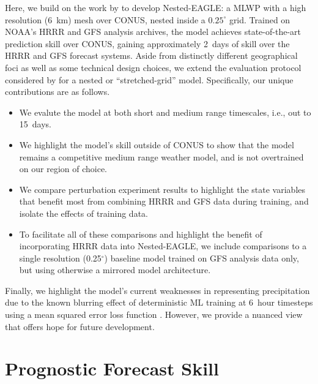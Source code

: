 \documentclass[11pt]{article}
\begin{document}
Here, we build on the work by \citet{nipen_regional_2026} to develop
Nested-EAGLE: a MLWP with a high resolution (6~km) mesh over CONUS, nested
inside a $0.25^{\circ}$ grid.
Trained on NOAA's HRRR and GFS analysis archives, the model
achieves state-of-the-art prediction skill over CONUS, gaining approximately
2~days of skill over the HRRR and GFS forecast systems.
Aside from distinctly different geographical foci as well as some technical design choices,
we extend the evaluation protocol considered by \citet{nipen_regional_2026} for a nested or
``stretched-grid'' model.
Specifically, our unique contributions are as follows.
\begin{itemize}
    \item We evalute the model at both short and medium range timescales, i.e.,
        out to 15~days.
    \item We highlight the model's skill outside of CONUS to show that the model
        remains a competitive medium range weather model, and is not overtrained
        on our region of choice.
    \item We compare perturbation experiment results to highlight the state variables
        that benefit most from combining HRRR and GFS data during training, and
        isolate the effects of training data. 
    \item To facilitate all of these comparisons and highlight the benefit of
        incorporating HRRR data into Nested-EAGLE, we include comparisons to a single
        resolution (0.25$^\circ$) baseline model trained on GFS analysis data
        only, but using otherwise a mirrored model architecture.
\end{itemize}
Finally, we highlight the model's current weaknesses in representing
precipitation due to the known blurring effect of deterministic ML training at
6~hour timesteps using a mean squared error loss function
\citep[e.g., as noted by][]{lam_learning_2023}.
However, we provide a nuanced view that offers hope for future development.

\section{Prognostic Forecast Skill}
\label{sec:prognostic_skill}
\end{document}
